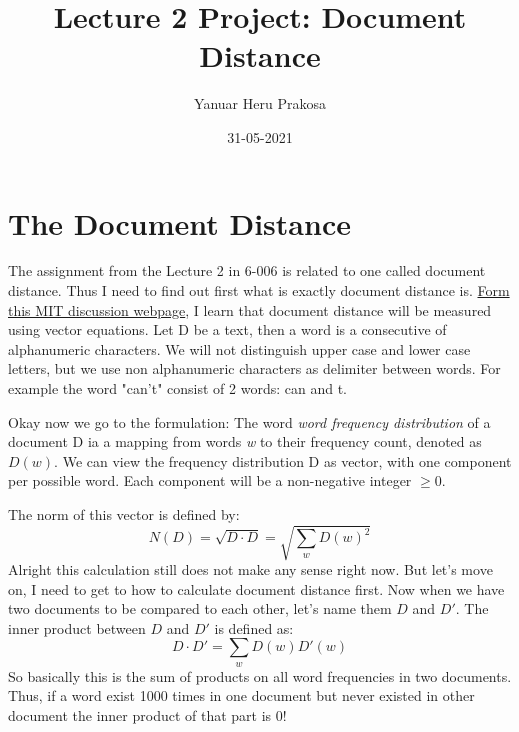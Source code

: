 \documentclass{article}
\title{Lecture 2 Project: Document Distance}
\author{Yanuar Heru Prakosa}
\date{31-05-2021}
\begin{document}
    \maketitle
    \tableofcontents

    \section{The Document Distance}
    The assignment from the Lecture 2 in 6-006 is related to one called document distance. 
    Thus I need to find out first what is exactly document distance is.  
    \href{http://6.006.scripts.mit.edu/~6.006/spring08/wiki/index.php?title=Document_Distance_Problem_Definition}{Form this MIT discussion webpage}, I learn that document distance will be measured using vector equations.
    Let D be a text, then a word is a consecutive of alphanumeric characters. 
    We will not distinguish upper case and lower case letters, but we use non alphanumeric characters as delimiter between words.
    For example the word "can't" consist of 2 words: can and t.
    
    Okay now we go to the formulation:
    The word \emph{word frequency distribution} of a document D ia a mapping from words \emph{w} to their frequency count, denoted as $D(w)$.
    We can view the frequency distribution D as vector, with one component per possible word. Each component will be a non-negative integer $\geq 0$.

    The norm of this vector is defined by:
    \begin{equation*}
        N(D) = \sqrt{D \cdot D} = \sqrt{\sum_{w}{D(w)^{2}}}
    \end{equation*}
    Alright this calculation still does not make any sense right now.
    But let's move on, I need to get to how to calculate document distance first.
    Now when we have two documents to be compared to each other, let's name them $D$ and $D'$. 
    The inner product between $D$ and $D'$ is defined as:
    \begin{equation*}
        D \cdot D' = \sum_{w}{D(w)D'(w)}
    \end{equation*}
    So basically this is the sum of products on all word frequencies in two documents.
    Thus, if a word exist 1000 times in one document but never existed in other document the inner product of that part is 0!
\end{document}
